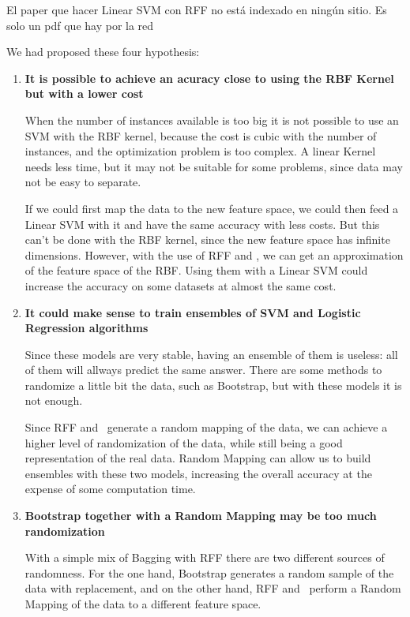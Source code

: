 \begin{tcolorbox}[breakable, colback=red,coltext=black]
  El paper que hacer Linear SVM con RFF no está indexado en ningún sitio. Es
  solo un pdf que hay por la red
\end{tcolorbox}
\begin{pre-delivery}
  We had proposed these four hypothesis:
  \begin{enumerate}
    \item \textbf{It is possible to achieve an acuracy close to using the
    RBF Kernel but with a lower cost}

    When the number of instances available is too big it is not possible to
    use an SVM with the RBF kernel, because the cost is cubic with the
    number of instances, and the optimization problem is too complex. A linear
    Kernel needs less time, but it may not be suitable for some problems,
    since data may not be easy to separate.

    If we could first map the data to the new feature space, we could then feed
    a Linear SVM with it and have the same accuracy with less costs. But this
    can't be done with the RBF kernel, since the new feature space has infinite
    dimensions. However, with the use of RFF and \Nys, we can get an approximation
    of the feature space of the RBF. Using them with a Linear SVM could
    increase the accuracy on some datasets at almost the same cost.

    \item \textbf{It could make sense to train ensembles of SVM and Logistic
    Regression algorithms}

    Since these models are very stable, having an ensemble of them is useless:
    all of them will allways predict the same answer. There are some
    methods to randomize a little bit the data, such as Bootstrap, but with
    these models it is not enough.

    Since RFF and \Nys\ generate a random mapping of the data, we can achieve
    a higher level of randomization of the data, while still being a good
    representation of the real data. Random Mapping can allow us to build
    ensembles with these two models, increasing the overall accuracy at the
    expense of some computation time.

    \item \textbf{Bootstrap together with a Random Mapping may be too much
    randomization}

    With a simple mix of Bagging with RFF there are two different sources
    of randomness. For the one hand, Bootstrap generates a random sample of
    the data with replacement, and on the other hand, RFF and \Nys\ perform
    a Random Mapping of the data to a different feature space.


\end{enumerate}
\end{pre-delivery}
